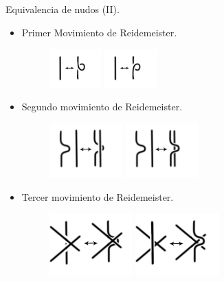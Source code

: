 \documentclass{beamer}
\begin{document}
\begin{frame}{Equivalencia de nudos (II).}
	\begin{itemize}
		\item Primer Movimiento de Reidemeister.
		\begin{figure}[h!]
			\includegraphics[width=2cm]{imagenes/movi1.png}
			\includegraphics[width=2cm]{imagenes/movi2.png}
		\end{figure}
		\pause
		\item Segundo movimiento de Reidemeister.
		\begin{figure}[h!]
			\includegraphics[width=2.8cm]{imagenes/movi3.png}
			\includegraphics[width=2.8cm]{imagenes/movi4.png}
		\end{figure}
		\pause
		\item Tercer movimiento de Reidemeister. 
		\begin{figure}[h!]
			\includegraphics[width=3.2cm]{imagenes/movi5.png}
			\includegraphics[width=3.2cm]{imagenes/movi6.png}
		\end{figure}
	\end{itemize}
\end{frame}
\end{document}
